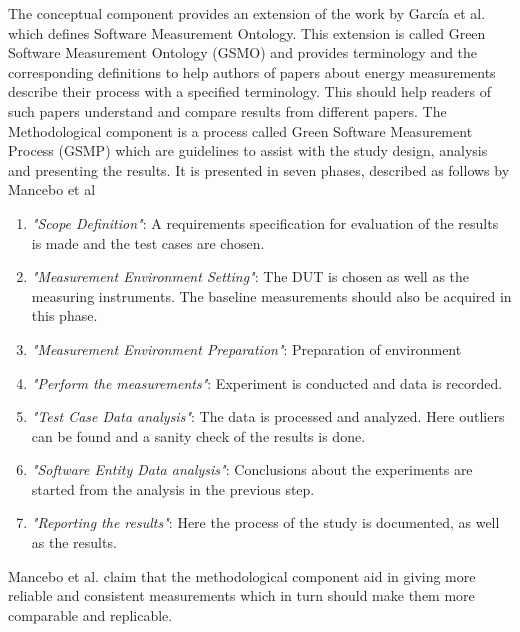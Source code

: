 %

The conceptual component provides an extension of the work by García et al.\cite{GarciaSMO} which defines Software Measurement Ontology. This extension is called Green Software Measurement Ontology (GSMO) and provides terminology and the corresponding definitions to help authors of papers about energy measurements describe their process with a specified terminology. This should help readers of such papers understand and compare results from different papers. The Methodological component is a process called Green Software Measurement Process (GSMP) which are guidelines to assist with the study design, analysis and presenting the results. It is presented in seven phases, described as follows by Mancebo et al\cite*{GarciaFEETINGS}
\begin{enumerate}
    \item \textit{"Scope Definition"}: A requirements specification for evaluation of the results is made and the test cases are chosen.
    \item \textit{"Measurement Environment Setting"}: The DUT is chosen as well as the measuring instruments. The baseline measurements should also be acquired in this phase.
    \item \textit{"Measurement Environment Preparation"}: Preparation of environment
    \item \textit{"Perform the measurements"}: Experiment is conducted and data is recorded. 
    \item \textit{"Test Case Data analysis"}: The data is processed and analyzed. Here outliers can be found and a sanity check of the results is done.
    \item \textit{"Software Entity Data analysis"}: Conclusions about the experiments are started from the analysis in the previous step.
    \item \textit{"Reporting the results"}: Here the process of the study is documented, as well as the results. 
\end{enumerate} 

Mancebo et al.\cite*{GarciaFEETINGS} claim that the methodological component aid in giving more reliable and consistent measurements which in turn should make them more comparable and replicable. 

